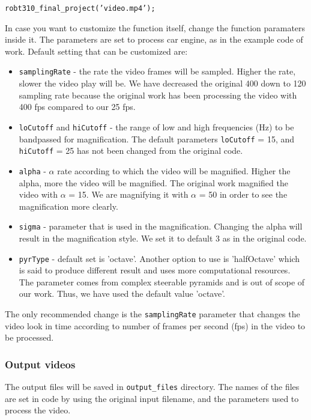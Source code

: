 \documentclass{IEEEtran}
\begin{document}
\texttt{robt310\_final\_project('video.mp4');}

In case you want to customize the function itself, change the function paramaters inside it. The parameters are set to process car engine, as in the example code of \cite{Wadhwa:2013:PVM:2461912.2461966} work. Default setting that can be customized are:

\begin{itemize}
	\item{\texttt{samplingRate} - the rate the video frames will be sampled. Higher the rate, slower the video play will be. We have decreased the original 400 down to 120 sampling rate because the original work has been processing the video with 400 fps compared to our 25 fps.}
	\item{\texttt{loCutoff} and \texttt{hiCutoff} - the range of low and high frequencies (Hz) to be bandpassed for magnification. The default parameters \texttt{loCutoff} = 15, and \texttt{hiCutoff} = 25 has not been changed from the original code.}
	\item{\texttt{alpha} - $\alpha$ rate according to which the video will be magnified. Higher the alpha, more the video will be magnified. The original work magnified the video with $\alpha$ = 15. We are magnifying it with $\alpha$ = 50 in order to see the magnification more clearly.}
	\item{\texttt{sigma} - parameter that is used in the magnification. Changing the alpha will result in the magnification style. We set it to default 3 as in the original code.}
	\item{\texttt{pyrType} - default set is 'octave'. Another option to use is 'halfOctave' which is said to produce different result and uses more computational resources. The parameter comes from complex steerable pyramids and is out of scope of our work. Thus, we have used the default value 'octave'.}
\end{itemize}

The only recommended change is the \texttt{samplingRate} parameter that changes the video look in time according to number of frames per second (fps) in the video to be processed.

\subsubsection{Output videos}

The output files will be saved in \texttt{output\_files} directory. The names of the files are set in code by using the original input filename, and the parameters used to process the video.
\end{document}
